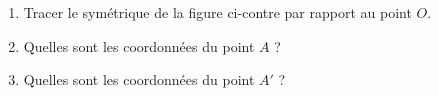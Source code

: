 
\begin{exercice}\label{exo2smath-0165}

    \begin{multicols}{2}
    \begin{enumerate}
        \item
Tracer le symétrique de la figure ci-contre par rapport au point \( O\).
        \item
            Quelles sont les coordonnées du point \( A\) ?
        \item
            Quelles sont les coordonnées du point \( A'\) ?
    \end{enumerate}
    \columnbreak
\begin{center}
   
\end{center}
    \end{multicols}

\end{exercice}
